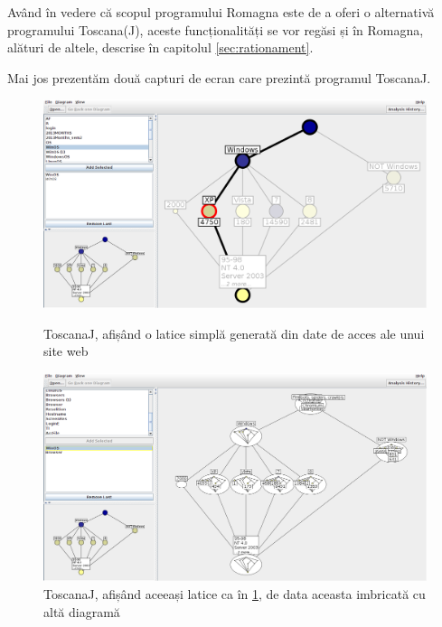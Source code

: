 \documentclass[12pt, a4paper, twoside, romanian]{teza-upb}
\begin{document}
        Având în vedere că scopul programului Romagna este de a oferi o alternativă programului Toscana(J), aceste funcționalități se vor regăsi și în Romagna, alături de altele, descrise în capitolul \ref{sec:rationament}.

        Mai jos prezentăm două capturi de ecran care prezintă programul ToscanaJ.

        \begin{figure}[h]
          \centering
          \includegraphics[width=\textwidth, natwidth=1366, natheight=744]{toscanaj-1.png} \\ 
          \caption{ToscanaJ, afișând o latice simplă generată din date de acces ale unui site web}
          \label{screenshot:toscana-1}
        \end{figure}
        \begin{figure}[h]
          \centering
          \includegraphics[width=\textwidth, natwidth=1366, natheight=744]{toscanaj-2.png}
          \caption{ToscanaJ, afișând aceeași latice ca în \ref{screenshot:toscana-1}, de data aceasta imbricată cu altă diagramă}
          \label{screenshot:toscana-2}
        \end{figure}
\end{document}
